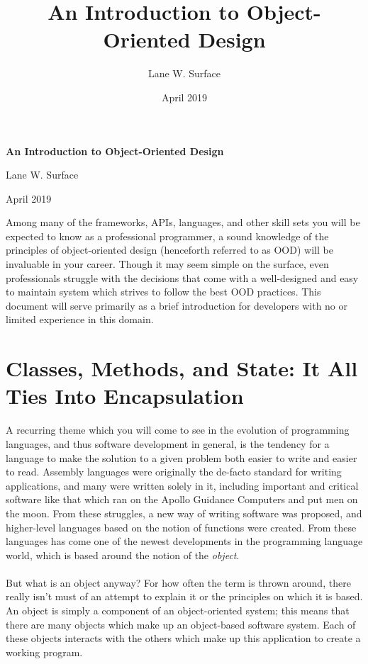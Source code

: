 \documentclass{article}
\title{An Introduction to Object-Oriented Design}
\author{Lane W. Surface}
\date{April 2019}
\begin{document}
\begin{center}
\vspace*{1.5cm}
\LARGE
\textbf{An Introduction to Object-Oriented Design}

\vspace{0.75cm}
\large
Lane W. Surface 

\vspace{0.35cm}
April 2019
\end{center}

\newpage
{}
\noindent
\textsf{
Among many of the frameworks, APIs, languages, and other skill sets you will be
expected to know as a professional programmer, a sound knowledge of the
principles of object-oriented design (henceforth referred to as OOD) will be
invaluable in your career. Though it may seem simple on the surface, even
professionals struggle with the decisions that come with a well-designed and
easy to maintain system which strives to follow the best OOD practices. This
document will serve primarily as a brief introduction for developers with no or
limited experience in this domain.
}

\section{Classes, Methods, and State: It All Ties Into Encapsulation}
A recurring theme which you will come to see in the evolution of programming
languages, and thus software development in general, is the tendency for a
language to make the solution to a given problem both easier to write and easier to read.
Assembly languages were originally the de-facto standard for writing
applications, and many were written solely in it, including important and
critical software like that which ran on the Apollo Guidance Computers and put
men on the moon. From these struggles, a new way of writing software was
proposed, and higher-level languages based on the notion of functions were
created. From these languages has come one of the newest developments in the
programming language world, which is based around the notion of the
\textit{object}.
\paragraph{}
But what is an object anyway? For how often the term is thrown around, there
really isn't must of an attempt to explain it or the principles on which it is
based. An object is simply a component of an object-oriented system; this means
that there are many objects which make up an object-based software system. Each
of these objects interacts with the others which make up this application to
create a working program.
\end{document}
